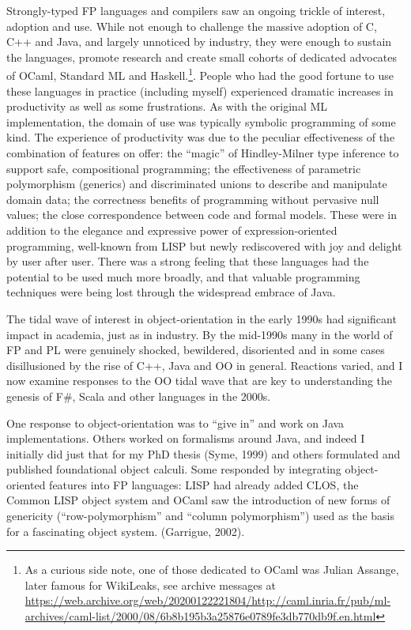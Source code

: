 \documentclass[acmsmall]{acmart}\settopmatter{}
\begin{document}
Strongly-typed FP languages and compilers saw an ongoing trickle of interest, adoption and use. While not enough to challenge the massive adoption of C, C++ and Java,
and largely unnoticed by industry, they were enough to sustain the languages, promote research and create small cohorts of dedicated advocates of OCaml, Standard ML
and Haskell.\footnote{As a curious side note, one of those dedicated to OCaml was Julian Assange, later famous for WikiLeaks, see archive messages
at \url{https://web.archive.org/web/20200122221804/http://caml.inria.fr/pub/ml-archives/caml-list/2000/08/6b8b195b3a25876e0789fe3db770db9f.en.html}}.   People who had the good fortune to use these languages
in practice (including myself) experienced dramatic increases in productivity as well as some frustrations. As with the original ML implementation, the domain of use was
typically symbolic programming of some kind. The experience of productivity was due to the peculiar effectiveness of the combination of features on offer: the “magic”
of Hindley-Milner type inference to support safe, compositional programming; the effectiveness of parametric polymorphism (generics) and discriminated unions to describe
and manipulate domain data; the correctness benefits of programming without pervasive null values; the close correspondence between code and formal models. These were
in addition to the elegance and expressive power of expression-oriented programming, well-known from LISP but newly rediscovered with joy and delight by user after
user. There was a strong feeling that these languages had the potential to be used much more broadly, and that valuable programming techniques were being lost through
the widespread embrace of Java.  

The tidal wave of interest in object-orientation in the early 1990s had significant impact in academia, just as in industry.  By the mid-1990s many in the world of FP and PL
were genuinely shocked, bewildered, disoriented and in some cases disillusioned by the rise of C++, Java and OO in general.  Reactions varied, and I now examine responses to
the OO tidal wave that are key to understanding the genesis of F\#, Scala and other languages in the 2000s. 

One response to object-orientation was to “give in” and work on Java implementations. Others worked on formalisms around Java, and indeed I initially
did just that for my PhD thesis (Syme, 1999) and others formulated and published foundational object calculi. Some responded by integrating object-oriented
features into FP languages: LISP had already added CLOS, the Common LISP object system and OCaml saw the introduction of new forms of
genericity (“row-polymorphism” and “column polymorphism”) used as the basis for a fascinating object system. (Garrigue, 2002).
\end{document}
